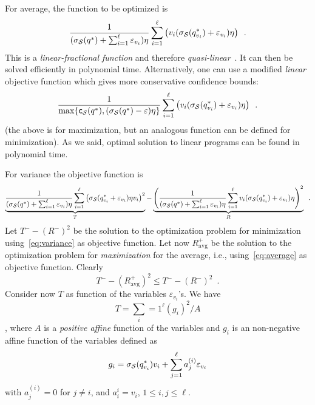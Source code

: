 For average, the function to be optimized is
\begin{equation}\label{eq:average}
\frac{1}{(\sigma_{\cal S}(q^*)+\sum_{i=1}^\ell\varepsilon_{v_i})\eta}\sum_{i=1}^\ell
\left(v_i(\sigma_{\cal S}(q^*_{v_i})+\varepsilon_{v_i})\eta\right)\enspace.
\end{equation}
This is a \emph{linear-fractional function} and therefore
\emph{quasi-linear}~\citep[Example 3.32]{BoydV04}. It can then be solved
efficiently in polynomial time\citemissing {}. Alternatively, one
can use a modified \emph{linear} objective function which gives more
conservative confidence bounds:
\[
\frac{1}{\max\{\mathsf{c}_{\cal S}(q^*),(\sigma_{\cal S}(q^*)-\varepsilon)\eta\}}\sum_{i=1}^\ell
\left(v_i(\sigma_{\cal S}(q^*_{v_i})+\varepsilon_{v_i})\eta\right)\enspace.
\]
(the above is for maximization, but an analogous function can be defined for
minimization). As we said, optimal solution to linear programs can be found in
polynomial time.

For variance the objective function is
%
\begin{equation}\label{eq:variance}
  \underbrace{
\frac{1}{(\sigma_{\cal S}(q^*)+\sum_{i=1}^\ell\varepsilon_{v_i})\eta}\sum_{i=1}^\ell
\left(\sigma_{\cal S}(q^*_{v_i}+\varepsilon_{v_i})\eta v_i\right)^2}_{T} -
\underbrace{\left(\frac{1}{(\sigma_{\cal S}(q^*)+\sum_{i=1}^\ell\varepsilon_{v_i})\eta}\sum_{i=1}^\ell
v_i(\sigma_{\cal S}(q^*_{v_i})+\varepsilon_{v_i})\eta \right)^2}_{R}\enspace.
\end{equation}
Let $T^--(R^-)^2$ be the solution to the optimization problem for minimization
using~\eqref{eq:variance} as objective function. Let now $R^+_{\mathrm{avg}}$ be
the solution to the optimization problem for \emph{maximization} for the
average, i.e., using~\eqref{eq:average} as objective function. Clearly 
\[
T^--(R^+_{\mathrm{avg}})^2\le T^--(R^-)^2\enspace.
\]
Consider now $T$ as function of the variables $\varepsilon_{v_i}$'s. We have
\[
T=\sum_i=1^\ell (g_i)^2/A
\], where $A$ is a \emph{positive affine} function of the variables and $g_i$ is
an non-negative affine function of the variables defined as
\[
g_i=\sigma_{\cal S}(q^*_{v_i})v_i + \sum_{j=1}^\ell a^{(i)}_j
\varepsilon_{v_i}
\]
with $a^{(i)}_j=0$ for $j\neq i$, and $a^{i}_i=v_i$, $1\le i,j\le \ell$.

